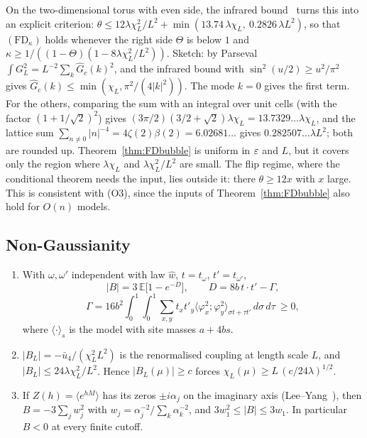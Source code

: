 On the two-dimensional torus with even side, the infrared bound~\cite{FSS76} turns this into an explicit criterion: $\theta\le12\lambda\chi_L^2/L^2+\min(13.74\,\lambda\chi_L,\ 0.2826\,\lambda L^2)$, so that $(\mathrm{FD}_\kappa)$ holds whenever the right side $\Theta$ is below $1$ and $\kappa\ge1/((1-\Theta)(1-8\lambda\chi_L^2/L^2))$. Sketch: by Parseval $\int G_L^2=L^{-2}\sum_k\hat G_c(k)^2$, and the infrared bound with $\sin^2(u/2)\ge u^2/\pi^2$ gives $\hat G_c(k)\le\min(\chi_L,\pi^2/(4|k|^2))$. The mode $k=0$ gives the first term. For the others, comparing the sum with an integral over unit cells (with the factor $(1+1/\sqrt2)^2$) gives $(3\pi/2)(3/2+\sqrt2)\lambda\chi_L=13.7329\ldots\lambda\chi_L$, and the lattice sum $\sum_{n\ne0}|n|^{-4}=4\zeta(2)\beta(2)=6.02681\ldots$ gives $0.282507\ldots\lambda L^2$; both are rounded up. Theorem~\ref{thm:FDbubble} is uniform in $\varepsilon$ and $L$, but it covers only the region where $\lambda\chi_L$ and $\lambda\chi_L^2/L^2$ are small. The flip regime, where the conditional theorem needs the input, lies outside it: there $\theta\ge12x$ with $x$ large. This is consistent with (O3), since the inputs of Theorem~\ref{thm:FDbubble} also hold for $O(n)$ models.

\subsection{Non-Gaussianity}

\begin{proposition}\label{prop:NG}
\begin{enumerate}
\item With $\omega,\omega'$ independent with law $\hat w$, $t=t_\omega$, $t'=t_{\omega'}$,
\[
|B|=3\,\mathbb E\big[1-e^{-D}\big],\qquad D=8b\,t\cdot t'-\Gamma,
\]
\[
\Gamma=16b^2\!\int_0^1\!\!\int_0^1\sum_{x,y}t_xt'_y\langle\varphi_x^2;\varphi_y^2\rangle_{\sigma t+\tau t'}\,d\sigma\,d\tau\ \ge0 ,
\]
where $\langle\cdot\rangle_s$ is the model with site masses $a+4bs$.
\item $|B_L|=-\bar u_4/(\chi_L^2L^2)$ is the renormalised coupling at length scale $L$, and $|B_L|\le24\lambda\chi_L^2/L^2$. Hence $|B_L(\mu)|\ge c$ forces $\chi_L(\mu)\ge L\,(c/24\lambda)^{1/2}$.
\item If $Z(h)=\langle e^{hM}\rangle$ has its zeros $\pm i\alpha_j$ on the imaginary axis (Lee--Yang~\cite{SG73}), then $B=-3\sum_jw_j^2$ with $w_j=\alpha_j^{-2}/\sum_k\alpha_k^{-2}$, and $3w_1^2\le|B|\le3w_1$. In particular $B<0$ at every finite cutoff.
\end{enumerate}
\end{proposition}

